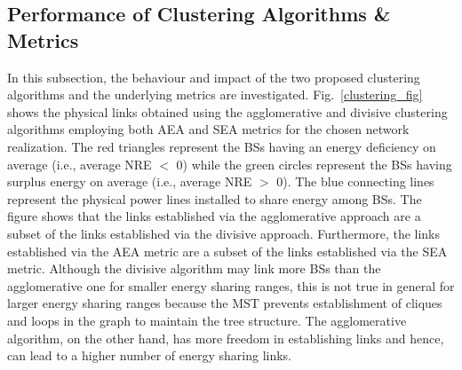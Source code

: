 \documentclass[10pt, letter,twocolumn]{IEEEtran}
\begin{document}
\vspace{-0.0cm}
\subsection{Performance of Clustering Algorithms \& Metrics} \vspace{-0.0cm}
In this subsection, the behaviour and impact of the two proposed clustering algorithms and the underlying metrics are investigated. Fig.~\ref{clustering_fig} shows the physical links obtained using the agglomerative and divisive clustering algorithms employing both AEA and SEA metrics for the chosen network realization. The red triangles represent the BSs having an energy deficiency on average (i.e., average NRE $<$ 0) while the green circles represent the BSs having surplus energy on average (i.e., average NRE $>$ 0). The blue connecting lines represent the physical power lines installed to share energy among BSs. The figure shows that the links established via the agglomerative approach are a subset of the links established via the divisive approach. Furthermore, the links established via the AEA metric are a subset of the links established via the SEA metric.
Although the divisive algorithm may link more BSs than the agglomerative one for smaller energy sharing ranges, this is not true in general for larger energy sharing ranges because the MST prevents establishment of cliques and loops in the graph to maintain the tree structure. The agglomerative algorithm, on the other hand, has more freedom in establishing links and hence, can lead to a higher number of energy sharing links.
\end{document}
